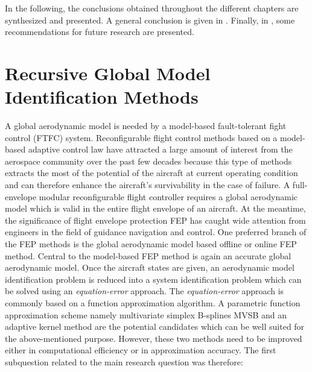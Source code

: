 
In the following, the conclusions obtained throughout the different chapters are synthesized and presented. A general conclusion is given in . Finally, in , some recommendations for future research are presented.


\section{Recursive Global Model Identification Methods}
\label{sec:03concl}

A global aerodynamic model is needed by a model-based fault-tolerant fight control (\ac{FTFC}) system.
Reconfigurable flight control methods based on a model-based adaptive control law have attracted a large amount of interest from the aerospace community over the past few decades because this type of methods extracts the most of the potential of the aircraft at current operating condition and can therefore enhance the aircraft's survivability in the case of failure. A full-envelope modular reconfigurable flight controller requires a global aerodynamic model which is valid in the entire flight envelope of an aircraft.
At the meantime, the significance of flight envelope protection \ac{FEP} has caught wide attention from engineers in the field of guidance navigation and control. One preferred branch of the \ac{FEP} methods is the global aerodynamic model based offline or online \ac{FEP} method. Central to the model-based \ac{FEP} method is again an accurate global aerodynamic model. Once the aircraft states are given, an aerodynamic model identification problem is reduced into a system identification problem which can be solved using an \textit{equation-error} approach. The \textit{equation-error} approach is commonly based on a function approximation algorithm. A parametric function approximation scheme namely multivariate simplex B-splines \ac{MVSB} and an adaptive kernel method are the potential candidates which can be well suited for the above-mentioned purpose. However, these two methods need to be improved either in computational efficiency or in approximation accuracy.
The first subquestion related to the main research question was therefore:\\

